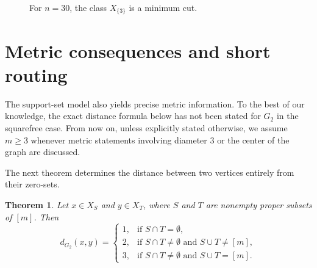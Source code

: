 \documentclass[12pt]{article}
\newtheorem{theorem}{Theorem}[section]
\theoremstyle{definition}
\begin{document}
	\begin{figure}[H]
		\centering
		\caption{For $n=30$, the class $X_{\{3\}}$ is a minimum cut.}
		\label{fig:cut30}
	\end{figure}
	
	\section{Metric consequences and short routing}\label{sec:distance}
	 The support-set model also yields precise metric information. To the best of our knowledge, the exact distance formula below has not been stated for $G_2$ in the squarefree case. From now on, unless explicitly stated otherwise, we assume $m\geq 3$ whenever metric statements involving diameter $3$ or the center of the graph are discussed.
	
	\medskip
	 The next theorem determines the distance between two vertices entirely from their zero-sets.
	\begin{theorem}\label{thm:distance}
		Let $x\in X_S$ and $y\in X_T$, where $S$ and $T$ are nonempty proper subsets of $[m]$. Then
		$$
		d_{G_2}(x,y)=
		\begin{cases}
			1,& \text{if } S\cap T=\emptyset,\\[2mm]
			2,& \text{if } S\cap T\neq \emptyset \text{ and } S\cup T\neq [m],\\[2mm]
			3,& \text{if } S\cap T\neq \emptyset \text{ and } S\cup T=[m].
		\end{cases}
		$$
	\end{theorem}
	
\end{document}
